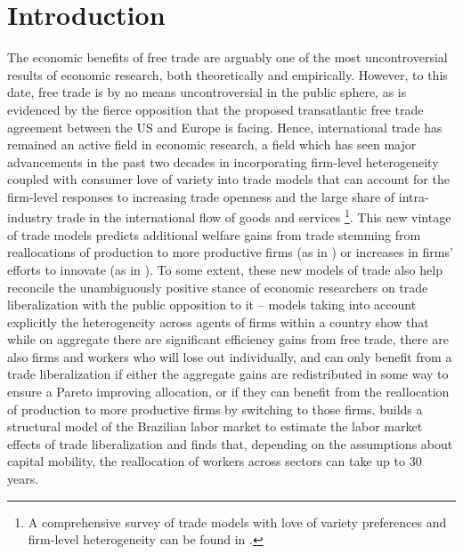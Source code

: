 \section{Introduction}
The economic benefits of free trade are arguably one of the most uncontroversial results of economic research, both theoretically and empirically. However, to this date, free trade is by no means uncontroversial in the public sphere, as is evidenced by the fierce opposition that the proposed transatlantic free trade agreement between the US and Europe is facing. Hence, international trade has remained an active field in economic research, a field which has seen major advancements in the past two decades in incorporating firm-level heterogeneity coupled with consumer love of variety into trade models that can account for the firm-level responses to increasing trade openness and the large share of intra-industry trade in the international flow of goods and services \footnote{A comprehensive survey of trade models with love of variety preferences and firm-level heterogeneity can be found in \citet*{MelitzTrefler2012}.}. This new vintage of trade models predicts additional welfare gains from trade stemming from reallocations of production to more productive firms (as in \citealp{Melitz2003}) or increases in firms' efforts to innovate (as in \citealp{GrossmanHelpman1990}). To some extent, these new models of trade also help reconcile the unambiguously positive stance of economic researchers on trade liberalization with the public opposition to it -- models taking into account explicitly the heterogeneity across agents of firms within a country show that while on aggregate there are significant efficiency gains from free trade, there are also firms and workers who will lose out individually, and can only benefit from a trade liberalization if either the aggregate gains are redistributed in some way to ensure a Pareto improving allocation, or if they can benefit from the reallocation of production to more productive firms by switching to those firms. \citet{DixCarneiro2014} builds a structural model of the Brazilian labor market to estimate the labor market effects of trade liberalization and finds that, depending on the assumptions about capital mobility, the reallocation of workers across sectors can take up to 30 years. \\
